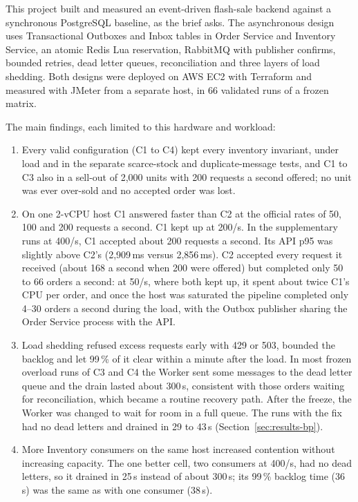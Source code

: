 \documentclass[a4paper]{report}
\begin{document}
This project built and measured an event-driven flash-sale backend against a
synchronous PostgreSQL baseline, as the brief asks. The asynchronous design
uses Transactional Outboxes and Inbox tables in Order Service and Inventory
Service, an atomic Redis Lua reservation, RabbitMQ with publisher confirms,
bounded retries, dead letter queues, reconciliation and three layers of load
shedding. Both designs were deployed on AWS EC2 with Terraform and measured with JMeter from
a separate host, in 66 validated runs of a frozen matrix.

The main findings, each limited to this hardware and workload:
\begin{enumerate}
  \item Every valid configuration (C1 to C4) kept every inventory invariant,
    under load and in the separate scarce-stock and duplicate-message tests,
    and C1 to C3 also in a sell-out of 2,000 units with 200 requests a second
    offered; no unit was ever over-sold and no accepted order was lost.
  \item On one 2-vCPU host C1 answered faster than C2 at the official rates of
    50, 100 and 200 requests a second. C1 kept up at 200/s. In the
    supplementary runs at 400/s, C1 accepted about 200 requests a second.
    Its API p95 was slightly above C2's (2,909\,ms versus 2,856\,ms).
    C2 accepted every request it received (about 168 a second when 200 were
    offered) but completed only 50 to 66 orders
    a second: at 50/s, where both kept up, it spent about twice C1's CPU per
    order, and once the host was saturated the pipeline completed only 4--30
    orders a second during the load, with the Outbox publisher sharing the
    Order Service process with the API.
  \item Load shedding refused excess requests early with 429 or 503,
    bounded the backlog and let 99\,\% of it clear within a minute after the
    load. In most frozen overload runs of C3 and C4 the Worker sent some
    messages to the dead letter queue and the drain lasted about 300\,s,
    consistent with those orders waiting for reconciliation, which became a
    routine recovery path. After the freeze, the Worker was changed to wait
    for room in a full queue.
    The runs with the fix had no dead letters and drained in 29 to 43\,s
    (Section~\ref{sec:results-bp}).
  \item More Inventory consumers on the same host increased contention without
    increasing capacity. The one better cell, two consumers at 400/s, had no
    dead
    letters, so it drained in 25\,s instead of about 300\,s; its 99\,\%
    backlog time (36\,s) was the same as with one consumer (38\,s).
\end{enumerate}
\end{document}
